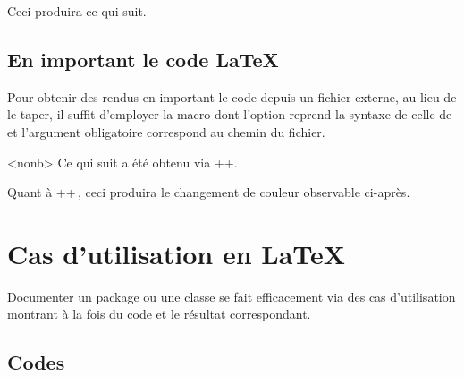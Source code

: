 

\begin{tdocexa}
    \leavevmode


    Ceci produira ce qui suit.

    \medskip

    
\end{tdocexa}


\subsection{En important le code \LaTeX}

Pour obtenir des rendus en important le code depuis un fichier externe, au lieu de le taper, il suffit d'employer la macro  dont l'option reprend la syntaxe de celle de  et l'argument obligatoire correspond au chemin du fichier.


\begin{tdocexa}<nonb>
    Ce qui suit a été obtenu via \tdocinlatex++.

    \medskip


    \medskip

    Quant à \tdocinlatex++\,, ceci produira le changement de couleur observable ci-après.

    \medskip

\end{tdocexa}


\section{Cas d'utilisation en \LaTeX}

Documenter un package ou une classe se fait efficacement via des cas d'utilisation montrant à la fois du code et le résultat correspondant.




\subsection{Codes } \label{tdoc-listing-inline}

